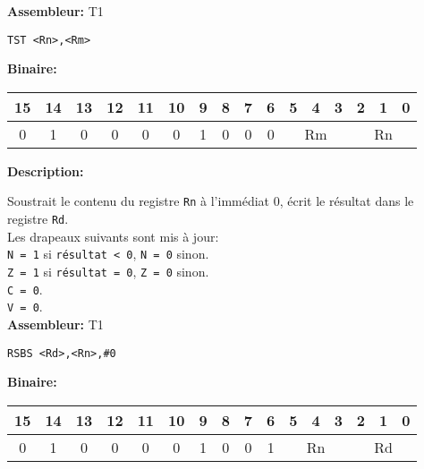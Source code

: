 \documentclass{article}
\begin{document}
    \textbf{Assembleur:} T1

    \begin{lstlisting}
TST <Rn>,<Rm>
    \end{lstlisting}

    \textbf{Binaire:}

    \begin{tabular}{| c c c c c c c c c c c c c c c c |}
        \hline
        15 & 14 & 13 & 12 & 11 & 10 & \multicolumn{1}{|c}{9} & 8 & 7 & 6 & \multicolumn{1}{|c}{5} & 4 & 3 & \multicolumn{1}{|c}{2} & 1 & 0 \\
        \hline
        0 & 1 & 0 & 0 & 0 & 0 & \multicolumn{1}{|c}{1} & 0 & 0 & 0 & \multicolumn{3}{|c}{Rm} & \multicolumn{3}{|c|}{Rn} \\
        \hline
    \end{tabular}




    \textbf{Description: }

    Soustrait le contenu du registre \texttt{Rn} à l'immédiat 0, écrit le résultat dans le registre \texttt{Rd}.\\
    Les drapeaux suivants sont mis à jour:\\
    \texttt{N = 1} si \texttt{résultat < 0}, \texttt{N = 0} sinon.\\
    \texttt{Z = 1} si \texttt{résultat = 0}, \texttt{Z = 0} sinon.\\
    \texttt{C = 0}.\\
    \texttt{V = 0}.\\

    \textbf{Assembleur:} T1

    \begin{lstlisting}
RSBS <Rd>,<Rn>,#0
    \end{lstlisting}

    \textbf{Binaire:}

    \begin{tabular}{| c c c c c c c c c c c c c c c c |}
        \hline
        15 & 14 & 13 & 12 & 11 & 10 & \multicolumn{1}{|c}{9} & 8 & 7 & 6 & \multicolumn{1}{|c}{5} & 4 & 3 & \multicolumn{1}{|c}{2} & 1 & 0 \\
        \hline
        0 & 1 & 0 & 0 & 0 & 0 & \multicolumn{1}{|c}{1} & 0 & 0 & 1 & \multicolumn{3}{|c}{Rn} & \multicolumn{3}{|c|}{Rd} \\
        \hline
    \end{tabular}
\end{document}
